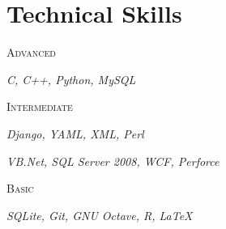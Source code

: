 \documentclass[]{article}
\begin{document}

\section{Technical Skills}

{\raggedright\textsc{Advanced} } \hfill {\raggedleft\textit{C, C++, Python, MySQL}}

{\raggedright\textsc{Intermediate}} \hfill {\raggedleft\textit{Django, YAML, XML, Perl}}

\hfill{\raggedleft\textit{VB.Net, SQL Server 2008, WCF, Perforce}}

{\raggedright\textsc{Basic}} \hfill {\raggedleft\textit{SQLite, Git, GNU Octave, R, \LaTeX}}
\end{document}
